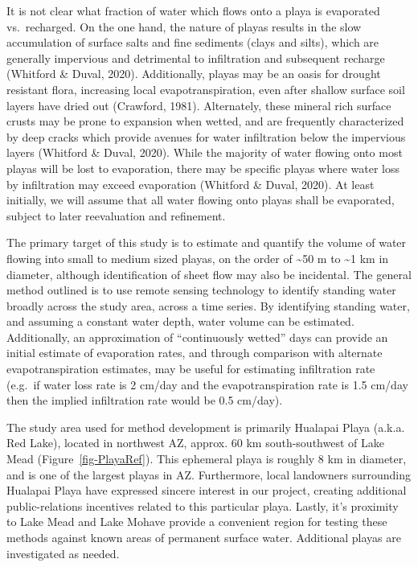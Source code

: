 \documentclass[
]{agujournal2019}
\begin{document}
It is not clear what fraction of water which flows onto a playa is
evaporated vs.~recharged. On the one hand, the nature of playas results
in the slow accumulation of surface salts and fine sediments (clays and
silts), which are generally impervious and detrimental to infiltration
and subsequent recharge (Whitford \& Duval, 2020). Additionally, playas
may be an oasis for drought resistant flora, increasing local
evapotranspiration, even after shallow surface soil layers have dried
out (Crawford, 1981). Alternately, these mineral rich surface crusts may
be prone to expansion when wetted, and are frequently characterized by
deep cracks which provide avenues for water infiltration below the
impervious layers (Whitford \& Duval, 2020). While the majority of water
flowing onto most playas will be lost to evaporation, there may be
specific playas where water loss by infiltration may exceed evaporation
(Whitford \& Duval, 2020). At least initially, we will assume that all
water flowing onto playas shall be evaporated, subject to later
reevaluation and refinement.

The primary target of this study is to estimate and quantify the volume
of water flowing into small to medium sized playas, on the order of
\textasciitilde50 m to \textasciitilde1 km in diameter, although
identification of sheet flow may also be incidental. The general method
outlined is to use remote sensing technology to identify standing water
broadly across the study area, across a time series. By identifying
standing water, and assuming a constant water depth, water volume can be
estimated. Additionally, an approximation of ``continuously wetted''
days can provide an initial estimate of evaporation rates, and through
comparison with alternate evapotranspiration estimates, may be useful
for estimating infiltration rate (e.g.~if water loss rate is 2 cm/day
and the evapotranspiration rate is 1.5 cm/day then the implied
infiltration rate would be 0.5 cm/day).

The study area used for method development is primarily Hualapai Playa
(a.k.a. Red Lake), located in northwest AZ, approx. 60 km
south-southwest of Lake Mead (Figure~\ref{fig-PlayaRef}). This ephemeral
playa is roughly 8 km in diameter, and is one of the largest playas in
AZ. Furthermore, local landowners surrounding Hualapai Playa have
expressed sincere interest in our project, creating additional
public-relations incentives related to this particular playa. Lastly,
it's proximity to Lake Mead and Lake Mohave provide a convenient region
for testing these methods against known areas of permanent surface
water. Additional playas are investigated as needed.
\end{document}
